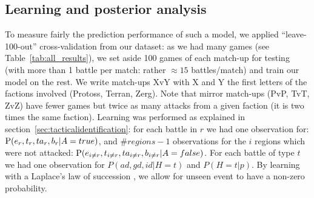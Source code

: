 \subsection{Learning and posterior analysis}
To measure fairly the prediction performance of such a model, we applied ``leave-100-out'' cross-validation from our dataset: as we had many games (see Table~\ref{tab:all_results}), we set aside 100 games of each match-up for testing (with more than 1 battle per match: rather $\approx 15$ battles/match) and train our model on the rest. We write match-ups XvY with X and Y the first letters of the factions involved (Protoss, Terran, Zerg). Note that mirror match-ups (PvP, TvT, ZvZ) have fewer games but twice as many attacks from a given faction (it is two times the same faction). Learning was performed as explained in section~\ref{sec:tacticalidentification}: for each battle in $r$ we had one observation for: $\mathrm{P}(e_r,t_r,ta_r,b_r|A=true)$, and $\#regions-1$ observations for the $i$ regions which were not attacked: $\mathrm{P}(e_{i \neq r},t_{i \neq r}, ta_{i \neq r}, b_{i \neq r}|A=false)$. For each battle of type $t$ we had one observation for $P(ad,gd,id|H=t)$ and $P(H=t|p)$. By learning with a Laplace's law of succession \cite{Jaynes}, we allow for unseen event to have a non-zero probability.

